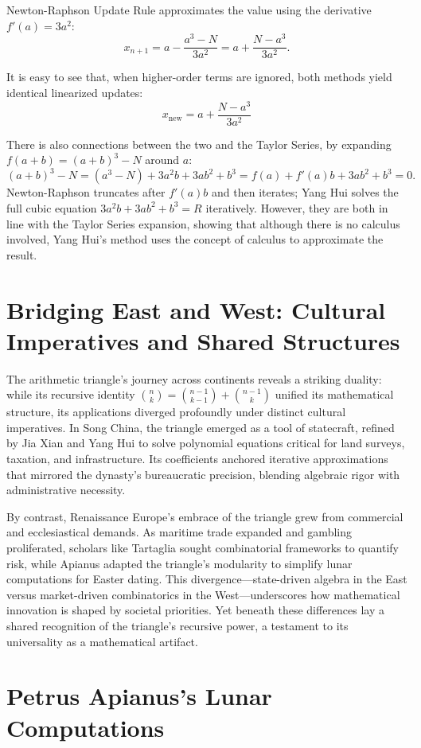 \documentclass{article}
\begin{document}
Newton-Raphson Update Rule approximates the value using the derivative \(f'(a) = 3a^2\):
\[
x_{n+1} = a - \frac{a^3 - N}{3a^2} = a + \frac{N - a^3}{3a^2}.
\]

It is easy to see that, when higher-order terms are ignored, both methods yield identical linearized updates:
\[
\boxed{x_{\text{new}} = a + \frac{N - a^3}{3a^2}}
\]

There is also connections between the two and the Taylor Series, by expanding \(f(a + b) = (a + b)^3 - N\) around \(a\):
\[
(a + b)^3 - N = (a^3 - N) + 3a^2b + 3ab^2 + b^3 = f(a)+f'(a)b+3ab^2+b^3=0.
\]
Newton-Raphson truncates after \(f'(a)b\) and then iterates; Yang Hui solves the full cubic equation \(3a^2b+3ab^2+b^3=R\) iteratively. However, they are both in line with the Taylor Series expansion, showing that although there is no calculus involved, Yang Hui's method uses the concept of calculus to approximate the result.

\section{Bridging East and West: Cultural Imperatives and Shared Structures}
The arithmetic triangle’s journey across continents reveals a striking duality: while its recursive identity 
$
\binom{n}{k} = \binom{n-1}{k-1} + \binom{n-1}{k}
$
unified its mathematical structure, its applications diverged profoundly under distinct cultural imperatives. In Song China, the triangle emerged as a tool of statecraft, refined by Jia Xian and Yang Hui to solve polynomial equations critical for land surveys, taxation, and infrastructure. Its coefficients anchored iterative approximations that mirrored the dynasty’s bureaucratic precision, blending algebraic rigor with administrative necessity.

By contrast, Renaissance Europe’s embrace of the triangle grew from commercial and ecclesiastical demands. As maritime trade expanded and gambling proliferated, scholars like Tartaglia sought combinatorial frameworks to quantify risk, while Apianus adapted the triangle’s modularity to simplify lunar computations for Easter dating. This divergence---state-driven algebra in the East versus market-driven combinatorics in the West---underscores how mathematical innovation is shaped by societal priorities. Yet beneath these differences lay a shared recognition of the triangle’s recursive power, a testament to its universality as a mathematical artifact.

\section{Petrus Apianus’s Lunar Computations}
\end{document}

